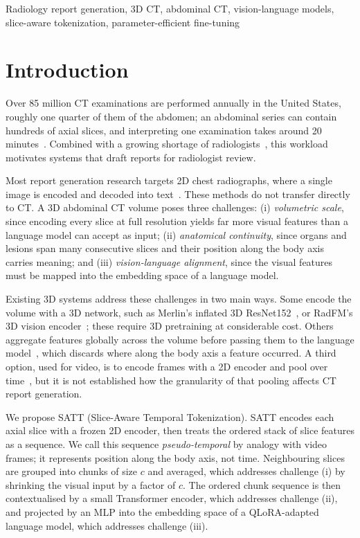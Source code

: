 \documentclass[conference]{IEEEtran}
\begin{document}
\begin{IEEEkeywords}
Radiology report generation, 3D CT, abdominal CT, vision-language models,
slice-aware tokenization, parameter-efficient fine-tuning
\end{IEEEkeywords}

\section{Introduction}

Over 85 million CT examinations are performed annually in the United States,
roughly one quarter of them of the abdomen; an abdominal series can contain
hundreds of axial slices, and interpreting one examination takes around
20 minutes~\cite{merlin}. Combined with a growing shortage of
radiologists~\cite{merlin}, this workload motivates systems that draft
reports for radiologist review.

Most report generation research targets 2D chest radiographs, where a single
image is encoded and decoded into text~\cite{jing2018,r2gen,camanet}. These
methods do not transfer directly to CT. A 3D abdominal CT volume poses three
challenges: (i) \emph{volumetric scale}, since encoding every slice at full
resolution yields far more visual features than a language model can accept
as input; (ii) \emph{anatomical continuity}, since organs and lesions span
many consecutive slices and their position along the body axis carries
meaning; and (iii) \emph{vision-language alignment}, since the visual
features must be mapped into the embedding space of a language model.

Existing 3D systems address these challenges in two main ways. Some encode
the volume with a 3D network, such as Merlin's inflated 3D
ResNet152~\cite{merlin}, or RadFM's 3D vision encoder~\cite{radfm}; these
require 3D pretraining at considerable cost. Others aggregate features
globally across the volume before passing them to the language
model~\cite{m3d,ct3dgpt}, which discards where along the body axis a feature
occurred. A third option, used for video, is to encode frames with a 2D
encoder and pool over time~\cite{videochatgpt}, but it is not established how
the granularity of that pooling affects CT report generation.

We propose SATT (Slice-Aware Temporal Tokenization). SATT encodes each axial
slice with a frozen 2D encoder, then treats the ordered stack of slice
features as a sequence. We call this sequence \emph{pseudo-temporal} by
analogy with video frames; it represents position along the body axis, not
time. Neighbouring slices are grouped into chunks of size $c$ and averaged,
which addresses challenge (i) by shrinking the visual input by a factor of
$c$. The ordered chunk sequence is then contextualised by a small Transformer
encoder, which addresses challenge (ii), and projected by an MLP into the
embedding space of a QLoRA-adapted language model, which addresses
challenge (iii).
\end{document}
